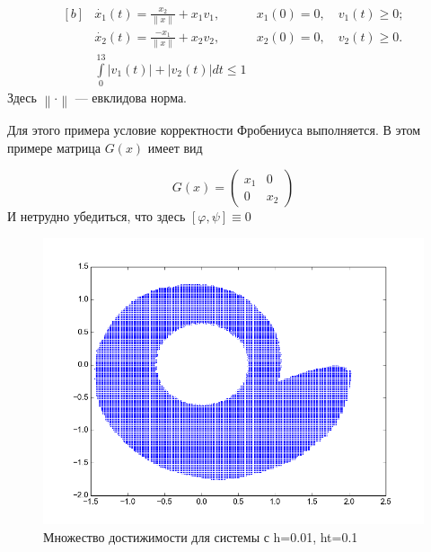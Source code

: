 \begin{equation*}
  \begin{aligned}[b]
    &\dot{x_1}(t) = \frac{x_2}{\left\|x\right\|} + x_1v_1, &x_1(0) =
    0,\quad v_1(t) \ge 0;\\
    &\dot{x_2}(t) = \frac{-x_1}{\left\|x\right\|} + x_2v_2, &x_2(0)
    = 0,\quad v_2(t) \ge 0.\\
    &\int\limits_0^{13} |v_1(t)| + |v_2(t)| dt \le 1
  \end{aligned}
\end{equation*}
Здесь $\left\| \cdot \right\|$ --- евклидова норма.

Для этого примера условие корректности
Фробениуса выполняется. 
В этом примере матрица $G(x)$ имеет вид 

\begin{equation*}
  G(x) = 
  \begin{pmatrix}
    x_1 & 0 \\
    0 & x_2
  \end{pmatrix}
\end{equation*}
И нетрудно убедиться, что здесь   $[\varphi,\psi] \equiv 0$

\begin{figure}[h]
  \centering
  \noindent \hfil
  \includegraphics[width=0.8\linewidth]{img/figure_d_h_001_ht_01}
  \hfil \caption{Множество достижимости для системы с h=0.01, ht=0.1}
  \label{fig:v1h0.02}
\end{figure}


